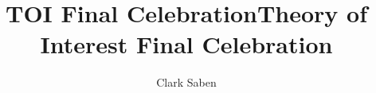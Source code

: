 \documentclass[12pt]{article}
\newenvironment{theorem}[2][Theorem]{\begin{trivlist}
\item[\hskip \labelsep {\bfseries #1}\hskip \labelsep {\bfseries #2.}]}{\end{trivlist}}
\newenvironment{lemma}[2][Lemma]{\begin{trivlist}
\item[\hskip \labelsep {\bfseries #1}\hskip \labelsep {\bfseries #2.}]}{\end{trivlist}}
\newenvironment{exercise}[2][Exercise]{\begin{trivlist}
\item[\hskip \labelsep {\bfseries #1}\hskip \labelsep {\bfseries #2.}]}{\end{trivlist}}
\newenvironment{problem}[2][Problem]{\begin{trivlist}
\item[\hskip \labelsep {\bfseries #1}\hskip \labelsep {\bfseries #2.}]}{\end{trivlist}}
\newenvironment{question}[2][Question]{\begin{trivlist}
\item[\hskip \labelsep {\bfseries #1}\hskip \labelsep {\bfseries #2.}]}{\end{trivlist}}
\newenvironment{corollary}[2][Corollary]{\begin{trivlist}
\item[\hskip \labelsep {\bfseries #1}\hskip \labelsep {\bfseries #2.}]}{\end{trivlist}}
\begin{document}
 
 
\title{TOI Final Celebration}%
\title{Theory of Interest Final Celebration}%
\author{Clark Saben\\ %
}%
\maketitle
\end{document}

